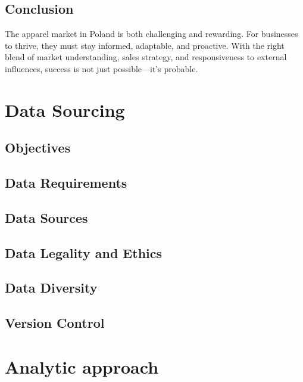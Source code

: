 \documentclass{article}
\begin{document}
\subsection{Conclusion}
The apparel market in Poland is both challenging and rewarding. For businesses to thrive, they must stay informed, adaptable, and proactive. With the right blend of market understanding, sales strategy, and responsiveness to external influences, success is not just possible—it's probable.

\section{Data Sourcing}

\subsection{Objectives}

\subsection{Data Requirements}

\subsection{Data Sources}

\subsection{Data Legality and Ethics}

\subsection{Data Diversity}

\subsection{Version Control}


\section{Analytic approach}





    
\end{document}

